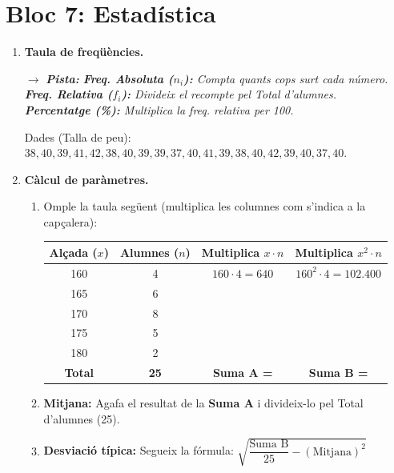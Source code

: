 \documentclass[12pt,a4paper]{article}
\newcommand{\pista}[1]{
    \par\vspace{2pt}
    {\small \color{blue!70!black} $\rightarrow$ \textit{\textbf{Pista:} #1}}
}
\begin{document}
\newpage
\section*{Bloc 7: Estadística}

\begin{enumerate}[resume]
    \item \textbf{Taula de freqüències.} 
    \pista{\textbf{Freq. Absoluta ($n_i$):} Compta quants cops surt cada número. \\ 
    \textbf{Freq. Relativa ($f_i$):} Divideix el recompte pel Total d'alumnes. \\
    \textbf{Percentatge (\%):} Multiplica la freq. relativa per 100.}
    
    Dades (Talla de peu): $38, 40, 39, 41, 42, 38, 40, 39, 39, 37, 40, 41, 39, 38, 40, 42, 39, 40, 37, 40$.
    \vspace{4cm}

    \item \textbf{Càlcul de paràmetres.}
    \begin{enumerate}
        \item Omple la taula següent (multiplica les columnes com s'indica a la capçalera):
        \begin{center}
        \begin{tabular}{|c|c|c|c|}
            \hline
            Alçada ($x$) & Alumnes ($n$) & Multiplica $x \cdot n$ & Multiplica $x^2 \cdot n$ \\ \hline
            160 & 4 & $160 \cdot 4 = 640$ & $160^2 \cdot 4 = 102.400$ \\ \hline
            165 & 6 & & \\ \hline
            170 & 8 & & \\ \hline
            175 & 5 & & \\ \hline
            180 & 2 & & \\ \hline
            \textbf{Total} & \textbf{25} & \textbf{Suma A =} & \textbf{Suma B =} \\ \hline
        \end{tabular}
        \end{center}
        
        \item \textbf{Mitjana:} Agafa el resultat de la \textbf{Suma A} i divideix-lo pel Total d'alumnes (25).
        \vspace{1cm}
        
        \item \textbf{Desviació típica:} Segueix la fórmula: $\sqrt{\dfrac{\text{Suma B}}{25} - (\text{Mitjana})^2}$
    \end{enumerate}
\end{enumerate}
\end{document}
